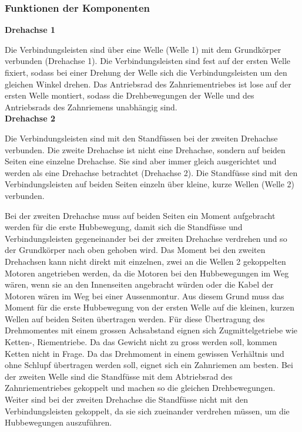 \newpage

\subsubsection{Funktionen der Komponenten}

\textbf{Drehachse 1}

Die Verbindungsleisten sind über eine Welle (Welle 1) mit dem Grundkörper verbunden (Drehachse 1). Die Verbindungsleisten sind fest auf der ersten Welle fixiert, sodass bei einer Drehung der Welle sich die Verbindungsleisten um den gleichen Winkel drehen. Das Antriebsrad des Zahnriementriebes ist lose auf der ersten Welle montiert, sodass die Drehbewegungen der Welle und des Antriebsrads des Zahnriemens unabhängig sind.
\\


\textbf{Drehachse 2}

Die Verbindungsleisten sind mit den Standfüssen bei der zweiten Drehachse verbunden. Die zweite Drehachse ist nicht eine Drehachse, sondern auf beiden Seiten eine einzelne Drehachse. Sie sind aber immer gleich ausgerichtet und werden als eine Drehachse betrachtet (Drehachse 2). Die Standfüsse sind mit den Verbindungsleisten auf beiden Seiten einzeln über kleine, kurze Wellen (Welle 2) verbunden. 

Bei der zweiten Drehachse muss auf beiden Seiten ein Moment aufgebracht werden für die erste Hubbewegung, damit sich die Standfüsse und Verbindungsleisten gegeneinander bei der zweiten Drehachse verdrehen und so der Grundkörper nach oben gehoben wird. Das Moment bei den zweiten Drehachsen kann nicht direkt mit einzelnen, zwei an die Wellen 2 gekoppelten Motoren angetrieben werden, da die Motoren bei den Hubbewegungen im Weg wären, wenn sie an den Innenseiten angebracht würden oder die Kabel der Motoren wären im Weg bei einer Aussenmontur. Aus diesem Grund muss das Moment für die erste Hubbewegung von der ersten Welle auf die kleinen, kurzen Wellen auf beiden Seiten übertragen werden. Für diese Übertragung des Drehmomentes mit einem grossen Achsabstand eignen sich Zugmittelgetriebe wie Ketten-, Riementriebe. Da das Gewicht nicht zu gross werden soll, kommen Ketten nicht in Frage. Da das Drehmoment in einem gewissen Verhältnis und ohne Schlupf übertragen werden soll, eignet sich ein Zahnriemen am besten. Bei der zweiten Welle sind die Standfüsse mit dem Abtriebsrad des Zahnriementriebes gekoppelt und machen so die gleichen Drehbewegungen. Weiter sind bei der zweiten Drehachse die Standfüsse nicht mit den Verbindungsleisten gekoppelt, da sie sich zueinander verdrehen müssen, um die Hubbewegungen auszuführen.

